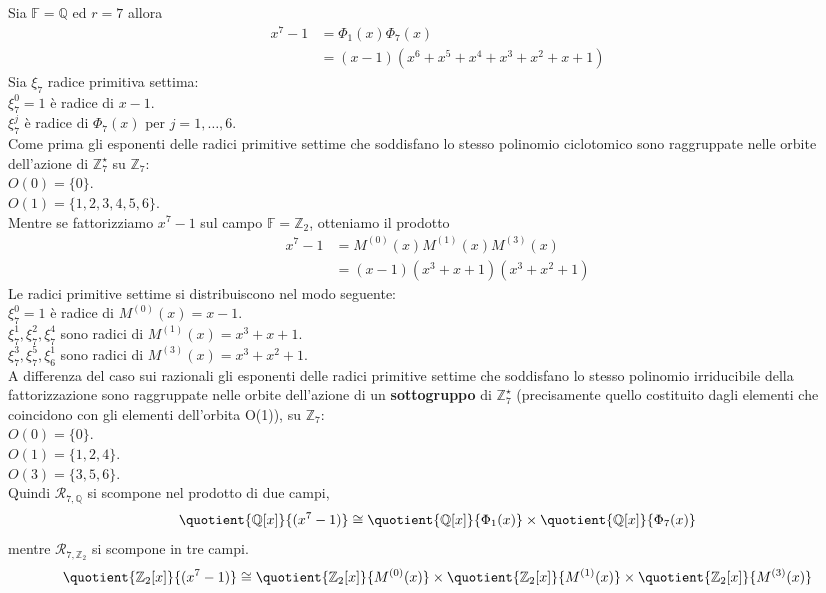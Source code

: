 \begin{esempio} \label{ese:fattorQ_7}
Sia $\mathbb{F} = \mathbb{Q}$ ed $r = 7$ allora
\begin{align*}
  x^{7} - 1 &= \Phi_{1}(x) \Phi_{7}(x) \\
            &= (x-1)(x^6 +x^5 + x^4 + x^3 +x^2 + x +1)
\end{align*}
Sia $\xi_{7}$ radice primitiva settima:\\
$\xi_{7}^{0} = 1$ è radice di $x-1$.\\
$\xi_{7}^{j}$ è radice di $\Phi_{7}(x)$ per $j = 1, \dots ,6 $.\\
Come prima gli esponenti delle radici primitive settime che soddisfano lo
stesso polinomio ciclotomico sono raggruppate nelle orbite dell'azione di
$\mathbb{Z}_{7}^{\star}$ su $\mathbb{Z}_{7}$: \\
$O(0)= \lbrace 0 \rbrace$.\\
$O(1)= \lbrace 1,2,3,4,5,6 \rbrace$.\\
Mentre se fattorizziamo $ x^{7} - 1$ sul campo $\mathbb{F} = \mathbb{Z}_{2}$,
otteniamo il prodotto
\begin{align*}
  x^{7} - 1 &= M^{(0)}(x) M^{(1)}(x) M^{(3)}(x) \\
            &= (x-1)(x^3 + x + 1)(x^3 + x^2 + 1)
\end{align*}
Le radici primitive settime si distribuiscono nel modo seguente: \\
$\xi_{7}^{0} = 1$ è radice di $M^{(0)}(x) = x-1$.\\
$\xi_{7}^{1}, \xi_{7}^{2}, \xi_{7}^{4}$ sono radici di $M^{(1)}(x) = x^3 + x +
1$.\\
$\xi_{7}^{3}, \xi_{7}^{5}, \xi_{6}^{1}$ sono radici di $M^{(3)}(x)= x^3 + x^2 +
1$.\\
A differenza del caso sui razionali gli esponenti delle radici primitive settime
che soddisfano lo
stesso polinomio irriducibile della fattorizzazione sono raggruppate nelle
orbite dell'azione di un {\bf sottogruppo} di
$\mathbb{Z}_{7}^{\star}$ (precisamente quello costituito dagli elementi che
coincidono con gli elementi dell'orbita O(1)), su $\mathbb{Z}_{7}$: \\
$O(0)= \lbrace 0 \rbrace$.\\
$O(1)= \lbrace 1,2,4 \rbrace$.\\
$O(3)= \lbrace 3,5,6 \rbrace$.\\
Quindi $ \mathcal{R}_{7, \mathbb{Q}} $ si scompone nel prodotto di due
campi,
\begin{align*}
\quotient{\mathbb{Q} \lbrack x \rbrack  }{(x^{7} - 1)}
\cong
\quotient{\mathbb{Q} \lbrack x \rbrack  }{\Phi_{1}(x)}
\times
\quotient{\mathbb{Q} \lbrack x \rbrack  }{\Phi_{7}(x)}
\end{align*}
mentre $\mathcal{R}_{7, \mathbb{Z}_{2}}$ si scompone in tre campi.
\begin{align*}
\quotient{\mathbb{Z}_{2} \lbrack x \rbrack  }{(x^{7} - 1)}
\cong
\quotient{\mathbb{Z}_{2} \lbrack x \rbrack  }{M^{(0)}(x)}
\times
\quotient{\mathbb{Z}_{2} \lbrack x \rbrack  }{M^{(1)}(x)}
\times
\quotient{\mathbb{Z}_{2} \lbrack x \rbrack  }{M^{(3)}(x)}
\end{align*}
\end{esempio}

